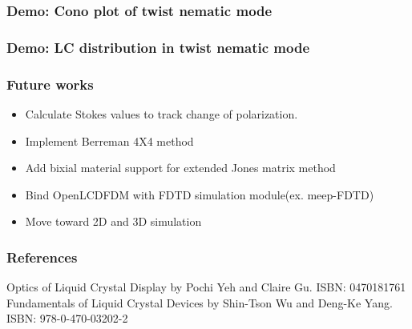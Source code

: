 \documentclass{beamer}
\begin{document}
\begin{frame}
\frametitle{Demo: Cono plot of twist nematic mode}
\end{frame}
\begin{frame}
\frametitle{Demo: LC distribution in twist nematic mode}
\end{frame}
\begin{frame}
\frametitle{Future works}
\begin{itemize}
\item Calculate Stokes values to track change of polarization.
\item Implement Berreman 4X4 method
\item Add bixial material support for extended Jones matrix method
\item Bind OpenLCDFDM with FDTD simulation module(ex. meep-FDTD)
\item Move toward 2D and 3D simulation
\end{itemize}
\end{frame}
\begin{frame}
\frametitle{References}
\begin{thebibliography}{0}
 Optics of Liquid Crystal Display by Pochi Yeh and Claire Gu. ISBN: 0470181761
 Fundamentals of Liquid Crystal Devices by Shin-Tson Wu and Deng-Ke Yang. ISBN: 978-0-470-03202-2
\end{thebibliography}
\end{frame}
\end{document}
